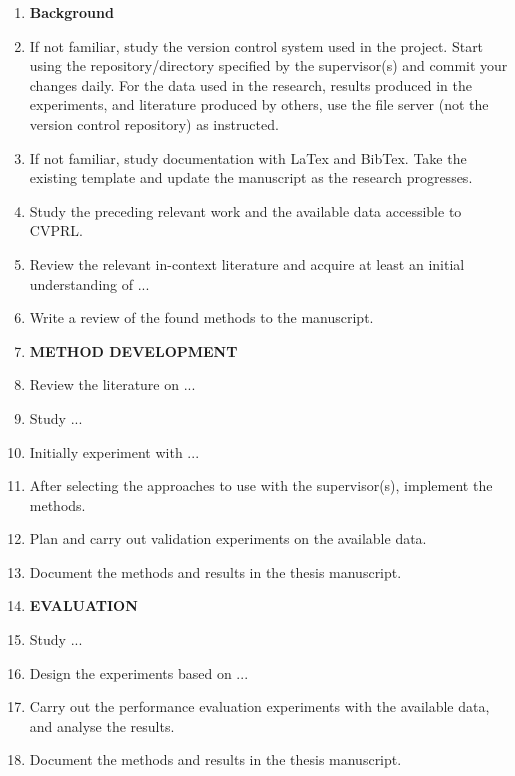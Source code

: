 \documentclass[11pt,a4,notitlepage]{article}
\begin{document}
\begin{enumerate}
\item[] \textbf{Background}
%
\item If not familiar, study the version control system used in the project.
Start using the repository/directory specified by the supervisor(s) and commit
your changes daily. For the data used in the research, results produced in the
experiments, and literature produced by others, use the file server (not the
version control repository) as instructed.
%
\item If not familiar, study documentation with LaTex and BibTex. Take the
existing template and update the manuscript as the research progresses.
%
%
\item Study the preceding relevant work and the available
data accessible to \ac{CVPRL}.
%
\item Review the relevant in-context literature and acquire at least an initial
understanding of ...
%
\item Write a review of the found methods to the manuscript.
%

\item[] \textbf{METHOD DEVELOPMENT}
%
\item Review the literature on ...
%
\item Study ...
%
\item Initially experiment with ...
%
\item After selecting the approaches to use with the supervisor(s), implement
the methods.
%
\item Plan and carry out validation experiments on the available data.
%
\item Document the methods and results in the thesis manuscript.
%

\item[] \textbf{EVALUATION}
%
\item Study ...
%
\item Design the experiments based on ...
%
\item Carry out the performance evaluation experiments with the available data,
and analyse the results.
%
\item Document the methods and results in the thesis manuscript.
%


\end{enumerate}
\end{document}

